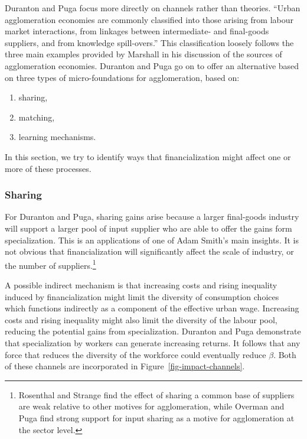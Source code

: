 Duranton and Puga \cite{durantonMicroFoundationsUrbanAgglomeration2004} focus more directly on channels rather than theories. ``Urban agglomeration economies are commonly classified into those arising from labour market interactions, from linkages between intermediate- and final-goods suppliers, and from knowledge spill-overs.'' This classification loosely follows the three main examples provided by Marshall \cite{marshallPrinciplesEconomics1890} in his discussion of the sources of agglomeration economies.  Duranton and Puga go on to offer an alternative based on three types of micro-foundations for agglomeration, based on:
\begin{enumerate}
\item sharing,
\item  matching, 
\item  learning mechanisms.
\end{enumerate}
In this section,  we try to identify ways that  financialization might affect one or more of these processes. 

\subsubsection{Sharing}
For Duranton and Puga, sharing gains arise because a larger final-goods industry will support a larger pool of input supplier who are able to offer the gains form specialization. This is an applications of one of Adam Smith's main insights. It is not obvious that financialization will significantly affect the scale of industry, or the number of suppliers.\footnote{Rosenthal and Strange \cite{rosenthalEvidenceNatureSources2004} find the effect of sharing a common base of suppliers  are weak relative to other motives for agglomeration, while 
 Overman and Puga \cite{overmanLaborPoolingSource2010} find strong support for input sharing as a motive for agglomeration at the sector level.}

A possible indirect mechanism is that increasing costs and rising inequality induced by financialization might limit the diversity of consumption choices which functions indirectly as a component of the effective urban wage. Increasing costs and rising inequality might also limit the diversity of the labour pool, reducing the potential gains from specialization. Duranton and Puga  demonstrate that specialization by workers can generate increasing returns. It follows that any force that reduces the diversity of the workforce could eventually reduce $\beta$.  Both of these channels are incorporated in Figure~\ref{fig-impact-channels}.

